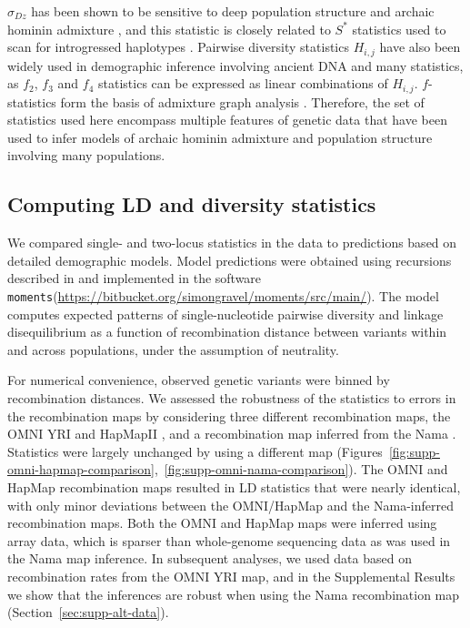 \documentclass[]{article}
\newcommand{\moments}{\texttt{moments}\xspace}
\begin{document}
$\sigma_{Dz}$ has been shown to be sensitive to deep population structure and
archaic hominin admixture \citep{Ragsdale2019-nt}, and this statistic is closely
related to $S^*$ statistics used to scan for introgressed haplotypes
\citep{Plagnol2006-lt}. Pairwise diversity statistics $H_{i,j}$ have also been
widely used in demographic inference involving ancient DNA and many statistics, as
$f_2$, $f_3$ and $f_4$ statistics can be expressed as linear combinations of
$H_{i,j}$. $f$-statistics form the basis of admixture graph analysis
\citep{Lipson2020-cq}. Therefore, the set of statistics used here encompass
multiple features of genetic data that have been used to infer models of
archaic hominin admixture and population structure involving many populations.

\subsection{Computing LD and diversity statistics}\label{sec:computing-stats}

We compared single- and two-locus statistics in the data to predictions based
on detailed demographic models. Model predictions were obtained using
recursions described in \citet{Ragsdale2019-nt} and implemented in the software
\moments (\url{https://bitbucket.org/simongravel/moments/src/main/}).
The model computes expected patterns of single-nucleotide pairwise diversity
and linkage disequilibrium as a function of recombination distance between
variants within and across populations, under the assumption of neutrality.

For numerical convenience, observed genetic variants were binned by
recombination distances. We assessed the robustness of the statistics to errors
in the recombination maps by considering three different recombination maps,
the OMNI YRI and HapMapII
\citep{1000_Genomes_Project_Consortium2015-zq,International_HapMap_Consortium2007-vn},
and a recombination map inferred from the Nama \citep{Van_Eeden2022-od}.
Statistics were largely unchanged by using a different map
(Figures~\ref{fig:supp-omni-hapmap-comparison},~\ref{fig:supp-omni-nama-comparison}).
The OMNI and HapMap recombination maps resulted in LD statistics that were
nearly identical, with only minor deviations between the OMNI/HapMap and the
Nama-inferred recombination maps. Both the OMNI and HapMap maps were inferred
using array data, which is sparser than whole-genome sequencing data as was
used in the Nama map inference. In subsequent analyses, we used data based on
recombination rates from the OMNI YRI map, and in the Supplemental Results we
show that the inferences are robust when using the Nama recombination map
(Section~\ref{sec:supp-alt-data}).
\end{document}
